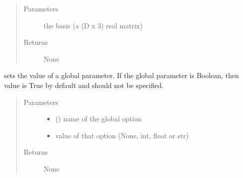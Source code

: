 \documentclass[letterpaper,10pt,english]{sphinxmanual}
\begin{document}
\begin{fulllineitems}
\label{\detokenize{functions:pyqcm.set_basis}}\begin{quote}\begin{description}
\item[{Parameters}] \leavevmode
\sphinxAtStartPar
{} \textendash{} the basis (a (D x 3) real matrix)

\item[{Returns}] \leavevmode
\sphinxAtStartPar
None

\end{description}\end{quote}

\end{fulllineitems}


\begin{fulllineitems}
\label{\detokenize{functions:pyqcm.set_global_parameter}}
\sphinxAtStartPar
sets the value of a global parameter. 
If the global parameter is Boolean, then value is True by default and should not be specified.
\begin{quote}\begin{description}
\item[{Parameters}] \leavevmode\begin{itemize}
\item {} 
\sphinxAtStartPar
{} () \textendash{} name of the global option

\item {} 
\sphinxAtStartPar
{} \textendash{} value of that option (None, int, float or str)

\end{itemize}

\item[{Returns}] \leavevmode
\sphinxAtStartPar
None

\end{description}\end{quote}

\end{fulllineitems}
\end{document}

